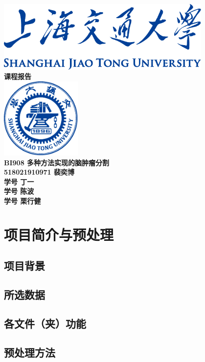 \documentclass[UTF8]{ctexart}
\begin{document}
\begin{titlepage}
    \begin{center}
        \includegraphics[width=0.8\textwidth]{sjtu-name-blue.pdf}\\[1cm]
        \textsc{\Huge \bfseries 课程报告}\\[1.5cm]
        \includegraphics[width=0.3\textwidth]{sjtu-badge-blue.pdf}\\[0.5cm]    

        \Huge \bfseries{BI908 多种方法实现的脑肿瘤分割}\\[1cm]
        \Large \bfseries{518021910971 裴奕博}\\
        \Large \bfseries{学号 丁一}\\
        \Large \bfseries{学号 陈波}\\
        \Large \bfseries{学号 栗行健}
    \end{center}
\end{titlepage}
\tableofcontents

\section{项目简介与预处理}
\subsection{项目背景}
\subsection{所选数据}
\subsection{各文件（夹）功能}
\subsection{预处理方法}
\end{document}
